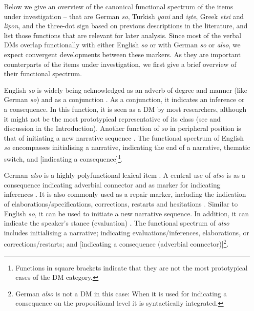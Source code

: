\documentclass[output=paper,colorlinks,citecolor=brown]{langscibook}
\begin{document}
Below we give an overview of the canonical functional spectrum of the items under investigation – that are German \textit{so}, Turkish \textit{yani} and \textit{işte}, Greek \textit{etsi} and \textit{lipon}, and the three-dot sign based on previous descriptions in the literature, and list those functions that are relevant for later analysis. Since most of the verbal DMs overlap functionally with either English \textit{so} or with German \textit{so} or \textit{also}, we expect convergent developments between these markers. As they are important counterparts of the items under investigation, we first give a brief overview of their functional spectrum.

English \textit{so} is widely being acknowledged as an adverb of degree and manner (like German \textit{so}) and as a conjunction \citep[e.g.][62]{muller_discourse_2005}. As a conjunction, it indicates an inference or a consequence. In this function, it is seen as a DM by most researchers, although it might not be the most prototypical representative of its class (see \citealt[62]{muller_discourse_2005} and discussion in the Introduction). Another function of \textit{so} in peripheral position is that of initiating a new narrative sequence \citep[cf.][]{bolden_implementing_2009}. The functional spectrum of English \textit{so} encompasses initialising a narrative, indicating the end of a narrative, thematic switch, and [indicating a consequence]\footnote{Functions in square brackets indicate that they are not the most prototypical cases of the DM category.}.

\noindent German \textit{also} is a highly polyfunctional lexical item \citep[e.g.][]{alm_also_2007, fernandez-villanueva_uses_2007, labrenz_functional_2023}. A central use of \textit{also} is as a consequence indicating adverbial connector and as marker for indicating inferences \citep{konerding_semantische_2004}. It is also commonly used as a repair marker, including the indication of elaborations/specifications, corrections, restarts and hesitations \citep[see][]{pfeiffer_uber_2017}. Similar to English \textit{so}, it can be used to initiate a new narrative sequence. In addition, it can indicate the speaker’s stance (evaluation) \citep{labrenz_functional_2023}. The functional spectrum of \textit{also} includes initialising a narrative; indicating evaluations/inferences, elaborations, or corrections/restarts; and [indicating a consequence (adverbial connector)]\footnote{German \textit{also} is not a DM in this case: When it is used for indicating a consequence on the propositional level it is syntactically integrated.}.
\end{document}
